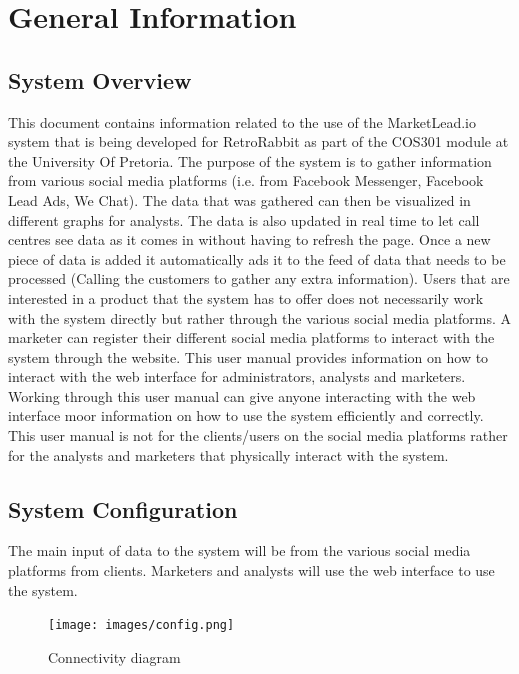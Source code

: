 \documentclass{article}
\begin{document}
	\cleardoublepage
	\tableofcontents
	\cleardoublepage
	
	\section{General Information}
		\subsection{System Overview}
			This document contains information related to the use of the MarketLead.io system that is being developed for RetroRabbit as part of the COS301 module at the University Of Pretoria.
			The purpose of the system is to gather information from various social media platforms (i.e. from Facebook Messenger, Facebook Lead Ads, We Chat). The data that was gathered can then be visualized in different graphs for analysts. 
			The data is also updated in real time to let call centres see data as it comes in without having to refresh the page. Once a new piece of data is added it automatically ads it to the feed of data that needs to be processed (Calling the customers to gather any extra information).
			Users that are interested in a product that the system has to offer does not necessarily work with the system directly but rather through the various social media platforms.
			A marketer can register their different social media platforms to interact with the system through the website.
			This user manual provides information on how to interact with the web interface for administrators, analysts and marketers. 
			Working through this user manual can give anyone interacting with the web interface moor information on how to use the system efficiently and correctly.
			This user manual is not for the clients/users on the social media platforms rather for the analysts and marketers that physically interact with the system.

		\subsection{System Configuration}
			The main input of data to the system will be from the various social media platforms from clients. Marketers and analysts will use the web interface to use the system.
			\begin{figure}[H]
				\centering
					\texttt{[image: images/config.png]}
				\caption{Connectivity diagram}
				\label{fig:config}
			\end{figure}
\end{document}

